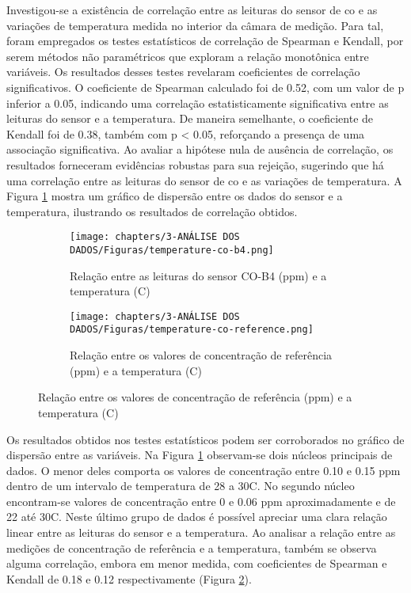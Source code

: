 Investigou-se a existência de correlação entre as leituras do sensor de \acrshort{co} e as variações de temperatura medida no interior da câmara de medição. Para tal, foram empregados os testes estatísticos de correlação de Spearman e Kendall, por serem métodos não paramétricos que exploram a relação monotônica entre variáveis. Os resultados desses testes revelaram coeficientes de correlação significativos. O coeficiente de Spearman calculado foi de 0.52, com um valor de p inferior a 0.05, indicando uma correlação estatisticamente significativa entre as leituras do sensor e a temperatura. De maneira semelhante, o coeficiente de Kendall foi de 0.38, também com p < 0.05, reforçando a presença de uma associação significativa. Ao avaliar a hipótese nula de ausência de correlação, os resultados forneceram evidências robustas para sua rejeição, sugerindo que há uma correlação entre as leituras do sensor de \acrshort{co} e as variações de temperatura. A Figura \ref{fig:data-temp-co-corr} mostra um gráfico de dispersão entre os dados do sensor e a temperatura, ilustrando os resultados de correlação obtidos. 

\begin{figure}[h]
    \centering
    \caption{Relação dos dados de concentração de \acrshort{co} com a temperatura}
    \begin{subfigure}{0.495\textwidth}
        \texttt{[image: chapters/3-ANÁLISE DOS DADOS/Figuras/temperature-co-b4.png]}
        \caption{Relação entre as leituras do sensor CO-B4 (ppm) e a temperatura (\textdegree C)}
        \label{fig:data-temp-co-corr}
    \end{subfigure}
    \hfill
    \begin{subfigure}{0.495\textwidth}
        \texttt{[image: chapters/3-ANÁLISE DOS DADOS/Figuras/temperature-co-reference.png]}
        \caption{Relação entre os valores de concentração de referência (ppm) e a temperatura (\textdegree C)}
        \label{fig:data-temp-co-ref-corr}
    \end{subfigure}
    \hfill
    \label{fig:data-co-temp}
\end{figure}

Os resultados obtidos nos testes estatísticos podem ser corroborados no gráfico de dispersão entre as variáveis. Na Figura \ref{fig:data-temp-co-corr} observam-se dois núcleos principais de dados. O menor deles comporta os valores de concentração entre 0.10 e 0.15 ppm dentro de um intervalo de temperatura de 28 a 30\textdegree C. No segundo núcleo encontram-se valores de concentração entre 0 e 0.06 ppm aproximadamente e de 22 até 30\textdegree C. Neste último grupo de dados é possível apreciar uma clara relação linear entre as leituras do sensor e a temperatura. Ao analisar a relação entre as medições de concentração de referência e a temperatura, também se observa alguma correlação, embora em menor medida, com coeficientes de Spearman e Kendall de 0.18 e 0.12 respectivamente (Figura \ref{fig:data-temp-co-ref-corr}).

